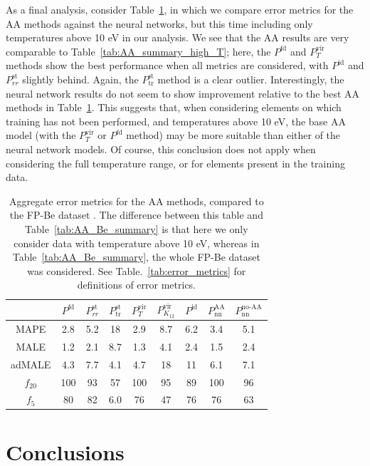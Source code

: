\documentclass[%
 preprint,
 superscriptaddress,
 amsmath,amssymb,
longbibliography,
]{revtex4-2}
\newcommand{\Pfd}{P^\textrm{fd}}
\newcommand{\Pstrr}{P^\textrm{st}_{rr}}
\newcommand{\Psttr}{P^\textrm{st}_\textrm{tr}}
\newcommand{\Pvirt}{P^\textrm{vir}_T}
\newcommand{\Pvirk}{P^\textrm{vir}_{K_{12}}}
\newcommand{\Pid}{P^\textrm{id}}
\newcommand{\Paa}{P_\textrm{nn}^\textrm{AA}}
\newcommand{\Pnaa}{P_\textrm{nn}^\textrm{no-AA}}
\begin{document}
As a final analysis, consider Table~\ref{tab:AA_Be_summary_high_temp}, in which we compare error metrics for the AA methods against the neural networks, but this time including only temperatures above 10 eV in our analysis. We see that the AA results are very comparable to Table~\ref{tab:AA_summary_high_T}; here, the $\Pfd$ and $\Pvirt$ methods show the best performance when all metrics are considered, with $\Pid$ and $\Pstrr$ slightly behind. Again, the $\Psttr$ method is a clear outlier. Interestingly, the neural network results do not seem to show improvement relative to the best AA methods in Table~\ref{tab:AA_Be_summary_high_temp}. This suggests that, when considering elements on which training has not been performed, and temperatures above 10 eV, the base AA model (with the $\Pvirt$ or $\Pfd$ method) may be more suitable than either of the neural network models. Of course, this conclusion does not apply when considering the full temperature range, or for elements present in the training data.


\begin{table}[]
    \centering
    \begin{tabular}{ccccccccc}
        \toprule
         & $\Pfd$ & $\Pstrr$ & $\Psttr$ & $\Pvirt$ & $\Pvirk$ & $\Pid$ & $\Paa$ & $\Pnaa$ \\ \midrule
        MAPE & 2.8 & 5.2 & 18 & 2.9 & 8.7 & 6.2 & 3.4 & 5.1\\
        MALE & 1.2 & 2.1 & 8.7 & 1.3 & 4.1 & 2.4 & 1.5 & 2.4 \\
        adMALE & 4.3 & 7.7 & 4.1 & 4.7 & 18 & 11 & 6.1 & 7.1 \\
        $f_{20}$ & 100 & 93 & 57 & 100 & 95 & 89 & 100 & 96 \\
        $f_{5}$ & 80 & 82 & 6.0 & 76 & 47 & 76 & 76 & 63 \\
        \bottomrule
    \end{tabular}
    \caption{Aggregate error metrics for the AA methods, compared to the FP-Be dataset \cite{Hu_Be_EOS}. The difference between this table and Table~\ref{tab:AA_Be_summary} is that here we only consider data with temperature above 10 eV, whereas in Table~\ref{tab:AA_Be_summary}, the whole FP-Be dataset was considered. See Table.~\ref{tab:error_metrics} for definitions of error metrics.}
    \label{tab:AA_Be_summary_high_temp}
\end{table}




\section{Conclusions}
\end{document}
